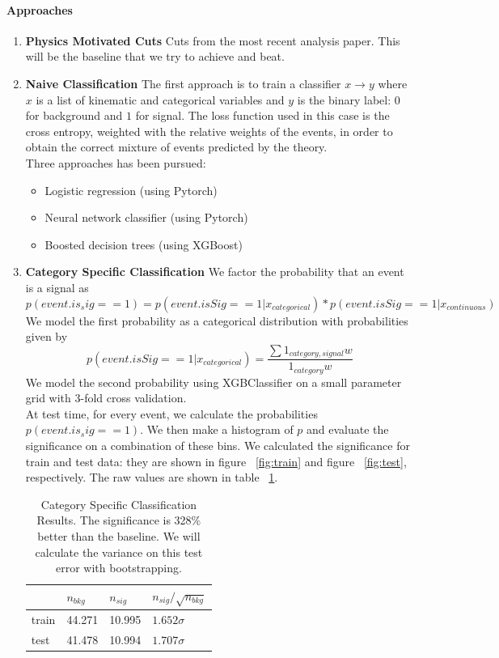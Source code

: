 \documentclass[11pt]{article}
\begin{document}
\paragraph{Approaches}
\begin{enumerate}

\item {\bf Physics Motivated Cuts}
Cuts from the most recent analysis paper. This will be the baseline that we try to achieve and beat.

\item {\bf Naive Classification}
The first approach is to train a classifier $x \rightarrow y$ where $x$ is a list of kinematic and categorical variables and $y$ is the binary label: $0$ for background and $1$ for signal. The loss function used in this case is the cross entropy, weighted with the relative weights of the events, in order to obtain the correct mixture of events predicted by the theory.\\
Three approaches has been pursued:
\begin{itemize}
    \item Logistic regression (using Pytorch)
    \item Neural network classifier (using Pytorch)
    \item Boosted decision trees (using XGBoost)
\end{itemize}

\item {\bf Category Specific Classification}
We factor the probability that an event is a signal as 
\[p(event.is_sig == 1) = p(event.isSig == 1|x_{categorical}) * p(event.isSig == 1|x_{continuous})\]
We model the first probability as a categorical distribution with probabilities given by 
$$p(event.isSig == 1|x_{categorical}) = \frac{\sum 1_{category, signal}w}{1_{category}w}$$
We model the second probability using XGBClassifier on a small parameter grid with 3-fold cross validation.\\
At test time, for every event, we calculate the probabilities $p(event.is_sig == 1)$. We then make a histogram of $p$ and evaluate the significance on a combination of these bins. We calculated the significance for train and test data: they are shown in figure ~\ref{fig:train} and figure ~\ref{fig:test}, respectively. The raw values are shown in table ~\ref{tab:smallsig}.



\begin{table}[!htbp]
\begin{center}
\begin{tabular}{|l|l|l|l|}
\cline{2-4}
\multicolumn{1}{c|}{} & $n_{bkg}$ & $n_{sig}$ & $n_{sig}/\sqrt{n_{bkg}}$\\
\hline
train & 44.271 & 10.995 & $1.652\sigma$\\
\hline
test & 41.478 & 10.994 & $1.707\sigma$\\
\hline
\end{tabular}
\caption{Category Specific Classification Results. The significance is 328$\%$ better than the baseline. We will calculate the variance on this test error with bootstrapping.}
\end{center}
\label{tab:smallsig}
\end{table}



\end{enumerate}
\end{document}
